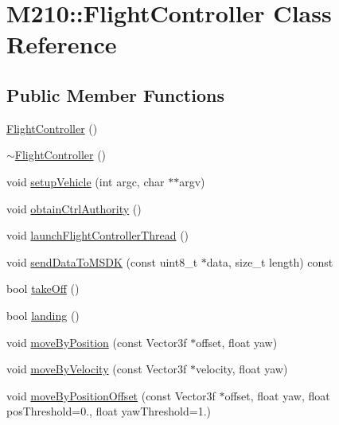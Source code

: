 \hypertarget{class_m210_1_1_flight_controller}{}\section{M210\+:\+:Flight\+Controller Class Reference}
\label{class_m210_1_1_flight_controller}
\subsection*{Public Member Functions}
\begin{DoxyCompactItemize}
\item 
\mbox{\hyperlink{class_m210_1_1_flight_controller_a5094a2c6e0bb587cdc9bffabbad11551}{Flight\+Controller}} ()
\item 
\mbox{\hyperlink{class_m210_1_1_flight_controller_a9e78eb4ab3bea35b29a031b607a68c12}{$\sim$\+Flight\+Controller}} ()
\item 
void \mbox{\hyperlink{class_m210_1_1_flight_controller_ab8249276f7d2079bf8c363d92fec56de}{setup\+Vehicle}} (int argc, char $\ast$$\ast$argv)
\item 
void \mbox{\hyperlink{class_m210_1_1_flight_controller_a922010e478d2e6cca4432fd076c8a857}{obtain\+Ctrl\+Authority}} ()
\item 
void \mbox{\hyperlink{class_m210_1_1_flight_controller_afb8ae49d6b33d9e45b35b626cb51446a}{launch\+Flight\+Controller\+Thread}} ()
\item 
void \mbox{\hyperlink{class_m210_1_1_flight_controller_aa84f9729545c25d95efdf7d5b58fa635}{send\+Data\+To\+M\+S\+DK}} (const uint8\+\_\+t $\ast$data, size\+\_\+t length) const
\item 
bool \mbox{\hyperlink{class_m210_1_1_flight_controller_a543d0eeef65856bf15675707cd8fc9c7}{take\+Off}} ()
\item 
bool \mbox{\hyperlink{class_m210_1_1_flight_controller_a5ea1c7a5b70af967b0449a945e1758b9}{landing}} ()
\item 
void \mbox{\hyperlink{class_m210_1_1_flight_controller_a9d2685ace4ecff840505a37b348c6860}{move\+By\+Position}} (const Vector3f $\ast$offset, float yaw)
\item 
void \mbox{\hyperlink{class_m210_1_1_flight_controller_a7468154793bfd7dd6c1d2f19d0744ee1}{move\+By\+Velocity}} (const Vector3f $\ast$velocity, float yaw)
\item 
void \mbox{\hyperlink{class_m210_1_1_flight_controller_a3921aba5edb9b26e717fbbace6f837cd}{move\+By\+Position\+Offset}} (const Vector3f $\ast$offset, float yaw, float pos\+Threshold=0., float yaw\+Threshold=1.)
$$
\end{DoxyCompactItemize}
